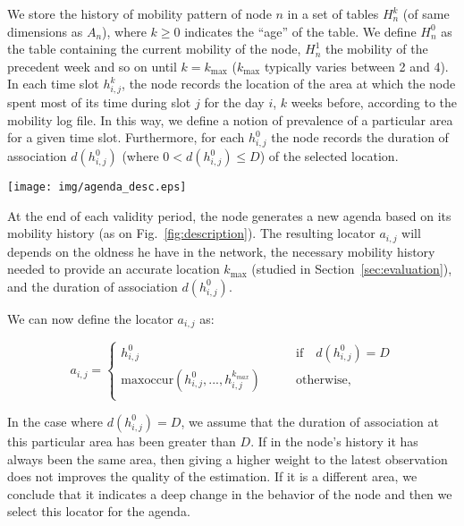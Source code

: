 \documentclass[a4paper]{sig-alternate-10pt}
\begin{document}
We store the history of mobility pattern of node $n$ in a set of
tables $H^k_{n}$ (of same dimensions as $A_{n}$), where $k \geq 0$
indicates the ``age'' of the table. We define $H_{n}^0$ as the table
containing the current mobility of the node, $H_{n}^1$ the mobility of
the precedent week and so on until $k=k_{\max}$ ($k_{\max}$
typically varies between 2 and 4). In each time slot $h_{i,j}^k$,
the node records the location of the area at which the node spent
most of its time during slot $j$ for the day $i$, $k$ weeks before,
according to the mobility log file. In this way, we define a notion
of prevalence of a particular area for a given time slot.
Furthermore, for each $h_{i,j}^0$ the node records the duration of
association $d(h_{i,j}^0)$ (where $0 < d(h_{i,j}^0) \leq D$) of the
selected location.


\begin{figure*}[t]
 \centering
 \texttt{[image: img/agenda\_desc.eps]}
 \caption{Example of a simplified agenda of associations.}
\label{fig:description}
\end{figure*}

At the end of each validity period, the node generates a new agenda
based on its mobility history (as on Fig.~\ref{fig:description}).
The resulting locator $a_{i,j}$ will depends on the oldness he have
in the network, the necessary mobility history needed to provide an
accurate location $k_{\max}$ (studied in
Section~\ref{sec:evaluation}), and the duration of association
$d(h_{i,j}^0)$.

We can now define the locator $a_{i,j}$ as:

\begin{equation}
a_{i,j}= \left\{
          \begin{array}{ll}
        h_{i,j}^0 & \qquad \mathrm{if}\quad d(h_{i,j}^0)=D\\
        \text{maxoccur}(h_{i,j}^0,...,h_{i,j}^{k_{max}}) & \qquad \mathrm{otherwise,}\\
      \end{array}
     \right.
\end{equation}

In the case where $d(h_{i,j}^0)=D$, we assume that the duration of
association at this particular area has been greater than $D$. If in
the node's history it has always been the same area, then giving a
higher weight to the latest observation does not improves the
quality of the estimation. If it is a different area, we conclude
that it indicates a deep change in the behavior of the node and then
we select this locator for the agenda.
\end{document}
